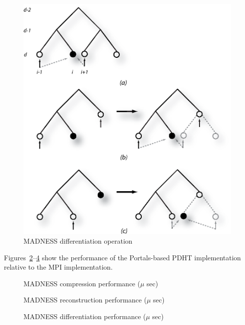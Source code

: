 \begin{figure}[ht]
  \center
  \includegraphics[width=.75\linewidth]{figs/diff}
  \caption{MADNESS differentiation operation}
  \label{fig:diff}
\end{figure}

Figures~\ref{fig:1}--\ref{fig:3} show the performance of the
Portals-based PDHT implementation relative to the MPI implementation.

\begin{figure}[ht]
  \center
  \fbox{\rule{2.5in}{0pt}\rule[-2.5in]{0pt}{4ex}}  
  \caption{MADNESS compression performance ($\mu$ sec)}
  \label{fig:1}
\end{figure}

\begin{figure}[ht]
  \center
  \fbox{\rule{2.5in}{0pt}\rule[-2.5in]{0pt}{4ex}}  
  \caption{MADNESS reconstruction performance ($\mu$ sec)}
  \label{fig:2}
\end{figure}

\begin{figure}[ht]
  \center
  \fbox{\rule{2.5in}{0pt}\rule[-2.5in]{0pt}{4ex}}  
  \caption{MADNESS differentiation performance ($\mu$ sec)}
  \label{fig:3}
\end{figure}


